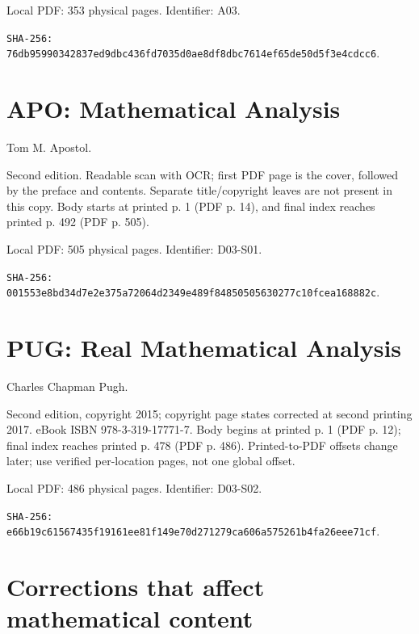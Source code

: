 \documentclass[11pt,oneside,openany]{book}
\theoremstyle{definition}
\theoremstyle{remark}
\begin{document}
Local PDF: 353 physical pages. Identifier: A03.

\par\noindent\texttt{SHA-256: 76db95990342837ed9dbc436fd7035d0\allowbreak ae8df8dbc7614ef65de50d5f3e4cdcc6}.

\section*{APO: Mathematical Analysis}

Tom M. Apostol.

Second edition. Readable scan with OCR; first PDF page is the cover, followed by the preface and contents. Separate title/copyright leaves are not present in this copy. Body starts at printed p. 1 (PDF p. 14), and final index reaches printed p. 492 (PDF p. 505).

Local PDF: 505 physical pages. Identifier: D03-S01.

\par\noindent\texttt{SHA-256: 001553e8bd34d7e2e375a72064d2349e\allowbreak 489f84850505630277c10fcea168882c}.

\section*{PUG: Real Mathematical Analysis}

Charles Chapman Pugh.

Second edition, copyright 2015; copyright page states corrected at second printing 2017. eBook ISBN 978-3-319-17771-7. Body begins at printed p. 1 (PDF p. 12); final index reaches printed p. 478 (PDF p. 486). Printed-to-PDF offsets change later; use verified per-location pages, not one global offset.

Local PDF: 486 physical pages. Identifier: D03-S02.

\par\noindent\texttt{SHA-256: e66b19c61567435f19161ee81f149e70\allowbreak d271279ca606a575261b4fa26eee71cf}.

\section*{Corrections that affect mathematical content}
\end{document}
